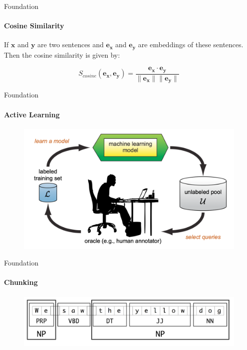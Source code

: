 \documentclass[aspectratio=169]{beamer}
\begin{document}
\begin{frame}{Foundation}
\framesubtitle{Cosine Similarity}

If $\boldsymbol{x}$ and $\boldsymbol{y}$ are two sentences and  $\boldsymbol{e_x}$ and $\boldsymbol{e_y}$ are embeddings of these sentences. Then the cosine similarity is given by:

\begin{equation}
\label{equation:cosinesimilarity}
S_{cosine}(\boldsymbol{e_x},\boldsymbol{e_y}) = \frac{\boldsymbol{e_x} \cdot \boldsymbol{e_y}}{\|\boldsymbol{e_x}\| \|\boldsymbol{e_y}\|}
\end{equation}

\end{frame}
\begin{frame}{Foundation}
\framesubtitle{Active Learning}
\begin{figure}
	\centering
	\includegraphics[scale = 0.25]{images/activelearningloopSettles.png}
	\label{fig:passage fe}
\end{figure}
\end{frame}
\begin{frame}{Foundation}
	\framesubtitle{Chunking}
	\begin{figure}
		\centering
		\includegraphics[scale = 0.5]{images/chunking.png}
		\label{fig:passage fe}
	\end{figure}
\begin{table}
	\centering
\end{table}
\end{frame}
\end{document}
